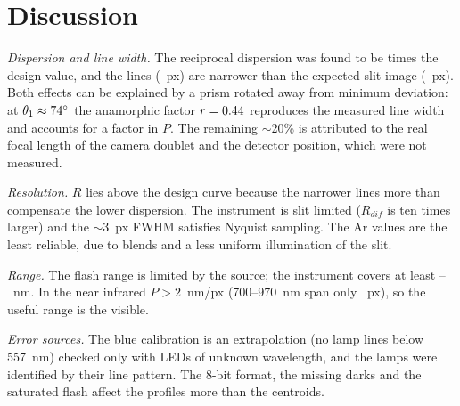 \section{Discussion}
\label{sec:disc}

\emph{Dispersion and line width.} The reciprocal dispersion was found to be \DispRatio{} times the design value, and the lines (\FWHMKr~px) are narrower than the expected slit image (\SlitImgPx~px). Both effects can be explained by a prism rotated away from minimum deviation: at $\theta_1\approx74^\circ$ the anamorphic factor $r=0.44$ reproduces the measured line width and accounts for a factor \DispRatioOff{} in $P$. The remaining $\sim$20\% is attributed to the real focal length of the camera doublet and the detector position, which were not measured.

\emph{Resolution.} $R$ lies above the design curve because the narrower lines more than compensate the lower dispersion. The instrument is slit limited ($R_{dif}$ is ten times larger) and the $\sim$3~px FWHM satisfies Nyquist sampling. The Ar values are the least reliable, due to blends and a less uniform illumination of the slit.

\emph{Range.} The flash range is limited by the source; the instrument covers at least \RangeDetMin--\RangeLastLine~nm. In the near infrared $P>2$~nm/px (700--970~nm span only \NPxNIR~px), so the useful range is the visible.

\emph{Error sources.} The blue calibration is an extrapolation (no lamp lines below 557~nm) checked only with LEDs of unknown wavelength, and the lamps were identified by their line pattern. The 8-bit format, the missing darks and the saturated flash affect the profiles more than the centroids.

